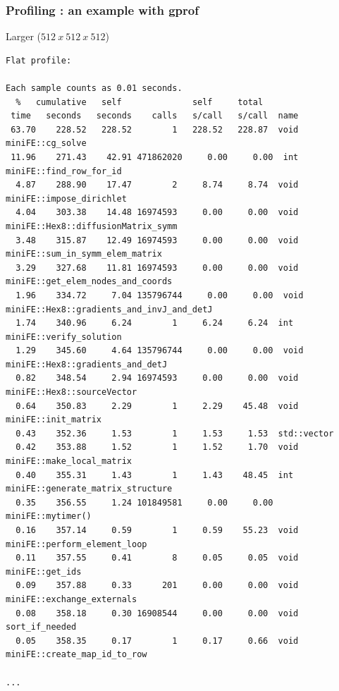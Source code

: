 \begin{frame}[containsverbatim]
	\frametitle{Profiling : an example with gprof}

Larger ($512~x~512~x~512$)

	\begin{Verbatim}[fontsize=\tiny]
Flat profile:

Each sample counts as 0.01 seconds.
  %   cumulative   self              self     total           
 time   seconds   seconds    calls   s/call   s/call  name    
 63.70    228.52   228.52        1   228.52   228.87  void miniFE::cg_solve
 11.96    271.43    42.91 471862020     0.00     0.00  int miniFE::find_row_for_id
  4.87    288.90    17.47        2     8.74     8.74  void miniFE::impose_dirichlet
  4.04    303.38    14.48 16974593     0.00     0.00  void miniFE::Hex8::diffusionMatrix_symm
  3.48    315.87    12.49 16974593     0.00     0.00  void miniFE::sum_in_symm_elem_matrix
  3.29    327.68    11.81 16974593     0.00     0.00  void miniFE::get_elem_nodes_and_coords
  1.96    334.72     7.04 135796744     0.00     0.00  void miniFE::Hex8::gradients_and_invJ_and_detJ
  1.74    340.96     6.24        1     6.24     6.24  int miniFE::verify_solution
  1.29    345.60     4.64 135796744     0.00     0.00  void miniFE::Hex8::gradients_and_detJ
  0.82    348.54     2.94 16974593     0.00     0.00  void miniFE::Hex8::sourceVector
  0.64    350.83     2.29        1     2.29    45.48  void miniFE::init_matrix
  0.43    352.36     1.53        1     1.53     1.53  std::vector
  0.42    353.88     1.52        1     1.52     1.70  void miniFE::make_local_matrix
  0.40    355.31     1.43        1     1.43    48.45  int miniFE::generate_matrix_structure
  0.35    356.55     1.24 101849581     0.00     0.00  miniFE::mytimer()
  0.16    357.14     0.59        1     0.59    55.23  void miniFE::perform_element_loop
  0.11    357.55     0.41        8     0.05     0.05  void miniFE::get_ids
  0.09    357.88     0.33      201     0.00     0.00  void miniFE::exchange_externals
  0.08    358.18     0.30 16908544     0.00     0.00  void sort_if_needed
  0.05    358.35     0.17        1     0.17     0.66  void miniFE::create_map_id_to_row

...
	\end{Verbatim}
\end{frame}

